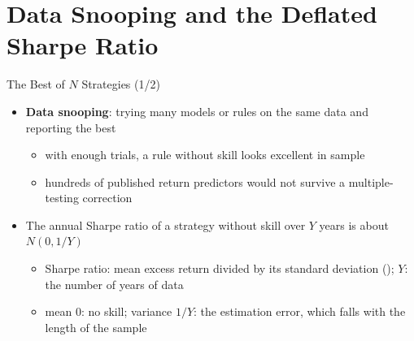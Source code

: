\section{Data Snooping and the Deflated Sharpe Ratio}

\begin{frame}{The Best of $N$ Strategies (1/2)}
\itemsize{\small}
\begin{itemize}
    \item \textbf{Data snooping}: trying many models or rules on the same data and reporting the best 
    \begin{itemize}
        \item with enough trials, a rule without skill looks excellent in sample
        \item hundreds of published return predictors would not survive a multiple-testing correction 
    \end{itemize}
    \item The annual Sharpe ratio of a strategy without skill over $Y$ years is about $N(0, 1/Y)$
    \begin{itemize}
        \item Sharpe ratio: mean excess return divided by its standard deviation (); $Y$: the number of years of data
        \item mean 0: no skill; variance $1/Y$: the estimation error, which falls with the length of the sample
    \end{itemize}
\end{itemize}
\end{frame}

